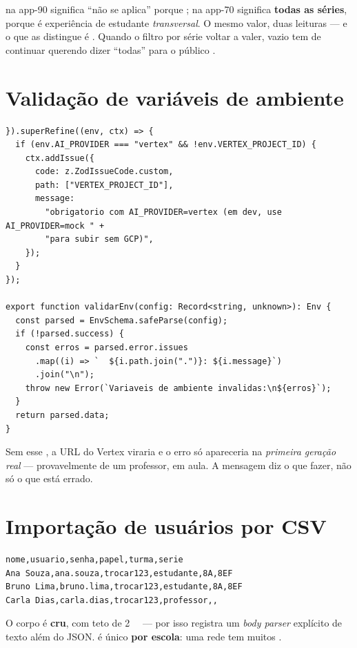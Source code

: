 \begin{nota}
 na app-90 significa \enquote{não se aplica} porque
; na app-70 significa \textbf{todas as séries}, porque é
experiência de estudante \emph{transversal}. O mesmo valor, duas leituras --- e o que
as distingue é . Quando o filtro por série voltar a valer, vazio tem
de continuar querendo dizer \enquote{todas} para o público .
\end{nota}

\section{Validação de variáveis de ambiente}

\begin{lstlisting}[language=tsunoo, caption={\arq{src/config/env.ts} --- o \emph{refine} que evita um incidente}]
}).superRefine((env, ctx) => {
  if (env.AI_PROVIDER === "vertex" && !env.VERTEX_PROJECT_ID) {
    ctx.addIssue({
      code: z.ZodIssueCode.custom,
      path: ["VERTEX_PROJECT_ID"],
      message:
        "obrigatorio com AI_PROVIDER=vertex (em dev, use AI_PROVIDER=mock " +
        "para subir sem GCP)",
    });
  }
});

export function validarEnv(config: Record<string, unknown>): Env {
  const parsed = EnvSchema.safeParse(config);
  if (!parsed.success) {
    const erros = parsed.error.issues
      .map((i) => `  ${i.path.join(".")}: ${i.message}`)
      .join("\n");
    throw new Error(`Variaveis de ambiente invalidas:\n${erros}`);
  }
  return parsed.data;
}
\end{lstlisting}

\begin{nota}
Sem esse , a URL do Vertex viraria
 e o erro só apareceria na \emph{primeira geração
real} --- provavelmente de um professor, em aula. A mensagem diz o que fazer, não
só o que está errado.
\end{nota}

\section{Importação de usuários por CSV}

\begin{lstlisting}[language=bashunoo, caption={\rota{POST /usuarios/importar-csv} --- corpo \cd{text/csv} cru}]
nome,usuario,senha,papel,turma,serie
Ana Souza,ana.souza,trocar123,estudante,8A,8EF
Bruno Lima,bruno.lima,trocar123,estudante,8A,8EF
Carla Dias,carla.dias,trocar123,professor,,
\end{lstlisting}

\begin{nota}
O corpo é  \textbf{cru}, com teto de \SI{2}{\mega\byte} --- por isso
 registra um \emph{body parser} explícito de texto além do JSON.
 é único \textbf{por escola}: uma rede tem muitos
.
\end{nota}
